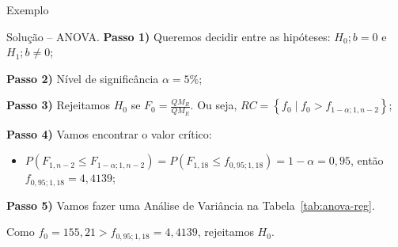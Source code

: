 \documentclass[8pt]{beamer}
\begin{document}
\begin{frame}{Exemplo}

\begin{block}{Solução -- ANOVA.}
	\textbf{Passo 1)} Queremos decidir entre as hipóteses: $H_0;b = 0$ e $H_1;b\neq 0$;
	
	\textbf{Passo 2)} Nível de significância $\alpha=5\%$;
	
	\textbf{Passo 3)} Rejeitamos $H_0$ se $F_0 = \frac{QM_R}{QM_E}$. Ou seja, $RC = \left\{ f_0 \mid f_0 > f_{1-\alpha; 1, n - 2} \right\}$;
	
	\textbf{Passo 4)} Vamos encontrar o valor crítico:
	\begin{itemize}
		\item $P\left( F_{1, n-2} \leq F_{1-\alpha; 1, n-2} \right) = P\left( F_{1, 18} \leq f_{0,95; 1, 18} \right) = 1- \alpha = 0,95$, então $f_{0,95; 1, 18} = 4,4139$;
	\end{itemize}

	\textbf{Passo 5)} Vamos fazer uma Análise de Variância na Tabela~\ref{tab:anova-reg}.
	\begin{table}[ht]
		\centering
		\caption{Tabela ANOVA para regressão linear simples.} 
		\label{tab:anova-reg}
	\end{table}

	Como $f_0 = 155,21 > f_{0,95;1, 18} = 4,4139$, rejeitamos $H_0$.
\end{block}

\end{frame}
\end{document}
